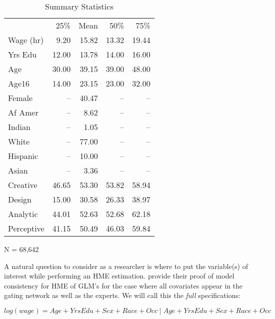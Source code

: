 \documentclass[12pt]{article}
\begin{document}
\begin{table} \centering
  \caption{Summary Statistics}
  \begin{threeparttable}
    \begin{tabular}[l]{l r r r r}
  \cmidrule{1-5}

              & 25\%   & Mean & 50\% & 75\%   \\
  \cmidrule{1-5}
  Wage (hr)   & 9.20  & 15.82 & 13.32  & 19.44\\
  Yrs Edu     & 12.00 & 13.78 & 14.00  & 16.00\\
  Age         & 30.00 & 39.15 & 39.00  & 48.00 \\
  Age16       & 14.00 & 23.15 & 23.00  & 32.00 \\
  Female      & --    & 40.47 & --     & --   \\
  Af Amer     & --    &  8.62 & --     & --   \\
  Indian      & --    &  1.05 & --     & --   \\
  White       & --    & 77.00 & --     & --   \\
  Hispanic    & --    & 10.00 & --     & --   \\
  Asian       & --    &  3.36 & --     & --   \\
  Creative    & 46.65 & 53.30 & 53.82  & 58.94 \\
  Design      & 15.00 & 30.58 & 26.33  & 38.97 \\
  Analytic    & 44.01 & 52.63 & 52.68  & 62.18 \\
  Perceptive  & 41.15 & 50.49 & 46.03  & 59.84 \\

  \hline
    \end{tabular}
    \begin{tablenotes}
      \item{\footnotesize N = 68,642}
    \end{tablenotes} \label{tbl:census_cov_summary}
  \end{threeparttable}
\end{table}


A natural question to consider as a researcher is where to put the variable(s)
of interest while performing an HME estimation. \cite{JiangTanner2000}
provide their proof of model consistency for HME of GLM's for the case where
all covariates appear in the gating network as well as the experts. We will
call this the \textit{full} specifications:

\begin{equation}
  log(wage) = Age + YrsEdu + Sex +  Race + Occ \; | \; Age + YrsEdu + Sex +  Race + Occ
\end{equation}
\end{document}
